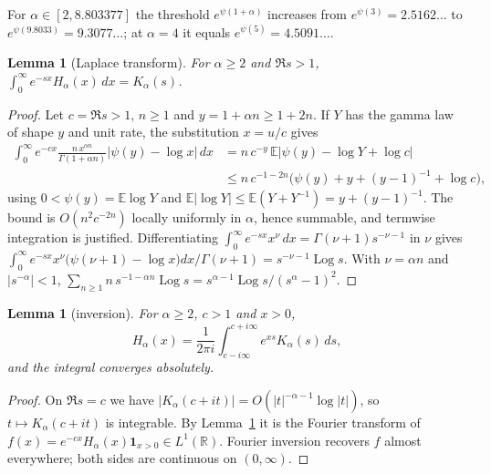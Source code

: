\documentclass[11pt,a4paper]{article}
\theoremstyle{plain}
\newtheorem{lemma}[theorem]{Lemma}
\theoremstyle{remark}
\newcommand{\E}{\mathbb E}
\newcommand{\R}{\mathbb R}
\DeclareMathOperator{\Log}{Log}
\begin{document}
For $\alpha\in[2,8.803377]$ the threshold $e^{\psi(1+\alpha)}$ increases from
$e^{\psi(3)}=2.5162\ldots$ to $e^{\psi(9.8033)}=9.3077\ldots$; at $\alpha=4$ it equals
$e^{\psi(5)}=4.5091\ldots$.

\begin{lemma}[Laplace transform]\label{lem:laplace}
For $\alpha\ge2$ and $\Re s>1$, $\displaystyle\int_0^\infty e^{-sx}H_\alpha(x)\,dx=K_\alpha(s)$.
\end{lemma}
\begin{proof}
Let $c=\Re s>1$, $n\ge1$ and $y=1+\alpha n\ge1+2n$. If $Y$ has the gamma law of shape $y$ and unit
rate, the substitution $x=u/c$ gives
\begin{align*}
 \int_0^\infty e^{-cx}\frac{n\,x^{\alpha n}}{\Gamma(1+\alpha n)}\bigl|\psi(y)-\log x\bigr|\,dx
 &=n\,c^{-y}\,\E\bigl|\psi(y)-\log Y+\log c\bigr|\\
 &\le n\,c^{-1-2n}\bigl(\psi(y)+y+(y-1)^{-1}+\log c\bigr),
\end{align*}
using $0<\psi(y)=\E\log Y$ and $\E|\log Y|\le\E(Y+Y^{-1})=y+(y-1)^{-1}$. The bound is
$O(n^2c^{-2n})$ locally uniformly in $\alpha$, hence summable, and termwise integration is
justified. Differentiating $\int_0^\infty e^{-sx}x^\nu\,dx=\Gamma(\nu+1)s^{-\nu-1}$ in $\nu$ gives
$\int_0^\infty e^{-sx}x^\nu\bigl(\psi(\nu+1)-\log x\bigr)dx/\Gamma(\nu+1)=s^{-\nu-1}\Log s$.
With $\nu=\alpha n$ and $|s^{-\alpha}|<1$,
$\sum_{n\ge1}n\,s^{-1-\alpha n}\Log s=s^{\alpha-1}\Log s/(s^\alpha-1)^2$.
\end{proof}

\begin{lemma}[inversion]\label{lem:inversion}
For $\alpha\ge2$, $c>1$ and $x>0$,
\[
 H_\alpha(x)=\frac{1}{2\pi i}\int_{c-i\infty}^{c+i\infty}e^{xs}K_\alpha(s)\,ds,
\]
and the integral converges absolutely.
\end{lemma}
\begin{proof}
On $\Re s=c$ we have $|K_\alpha(c+it)|=O(|t|^{-\alpha-1}\log|t|)$, so $t\mapsto K_\alpha(c+it)$ is
integrable. By Lemma~\ref{lem:laplace} it is the Fourier transform of
$f(x)=e^{-cx}H_\alpha(x)\mathbf 1_{x>0}\in L^1(\R)$. Fourier inversion recovers $f$ almost
everywhere; both sides are continuous on $(0,\infty)$.
\end{proof}
\end{document}
